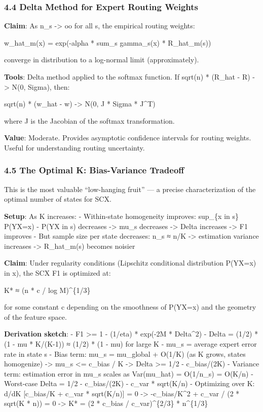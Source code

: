 \documentclass[
  12pt,
]{ctexart}
\begin{document}
\subsubsection{4.4 Delta Method for Expert Routing
Weights}\label{delta-method-for-expert-routing-weights}

\textbf{Claim}: As n\_s -\textgreater{} oo for all s, the empirical
routing weights:

w\_hat\_m(x) = exp(-alpha * sum\_s gamma\_s(x) * R\_hat\_m(s))

converge in distribution to a log-normal limit (approximately).

\textbf{Tools}: Delta method applied to the softmax function. If sqrt(n)
* (R\_hat - R) -\textgreater{} N(0, Sigma), then:

sqrt(n) * (w\_hat - w) -\textgreater{} N(0, J * Sigma * J\^{}T)

where J is the Jacobian of the softmax transformation.

\textbf{Value}: Moderate. Provides asymptotic confidence intervals for
routing weights. Useful for understanding routing uncertainty.

\subsubsection{4.5 The Optimal K: Bias-Variance
Tradeoff}\label{the-optimal-k-bias-variance-tradeoff}

This is the most valuable ``low-hanging fruit'' --- a precise
characterization of the optimal number of states for SCX.

\textbf{Setup}: As K increases: - Within-state homogeneity improves:
sup\_\{x in s\} \textbar P(Y\textbar X=x) - P(Y\textbar X in
s)\textbar{} decreases -\textgreater{} mu\_s decreases -\textgreater{}
Delta increases -\textgreater{} F1 improves - But sample size per state
decreases: n\_s ≈ n/K -\textgreater{} estimation variance increases
-\textgreater{} R\_hat\_m(s) becomes noisier

\textbf{Claim}: Under regularity conditions (Lipschitz conditional
distribution P(Y\textbar X=x) in x), the SCX F1 is optimized at:

K* ≈ (n * c / log M)\^{}\{1/3\}

for some constant c depending on the smoothness of P(Y\textbar X=x) and
the geometry of the feature space.

\textbf{Derivation sketch}: - F1 \textgreater= 1 - (1/eta) * exp(-2M *
Delta\^{}2) - Delta = (1/2) * (1 - mu * K/(K-1)) ≈ (1/2) * (1 - mu) for
large K - mu\_s = average expert error rate in state s - Bias term:
mu\_s = mu\_global + O(1/K) (as K grows, states homogenize)
-\textgreater{} mu\_s \textless= c\_bias / K -\textgreater{} Delta
\textgreater= 1/2 - c\_bias/(2K) - Variance term: estimation error in
mu\_s scales as Var(mu\_hat) = O(1/n\_s) = O(K/n) - Worst-case Delta =
1/2 - c\_bias/(2K) - c\_var * sqrt(K/n) - Optimizing over K: d/dK
{[}c\_bias/K + c\_var * sqrt(K/n){]} = 0 -\textgreater{} -c\_bias/K\^{}2
+ c\_var / (2 * sqrt(K * n)) = 0 -\textgreater{} K* = (2 * c\_bias /
c\_var)\^{}\{2/3\} * n\^{}\{1/3\}
\end{document}
